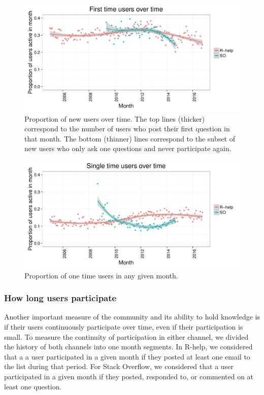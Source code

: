 \documentclass[smallextended]{svjour3}       %
\newcommand{\SO}{Stack Overflow\xspace}
\newcommand{\RH}{R-help\xspace}
\begin{document}
\begin{figure}[htbp]
  \centering
  \includegraphics[width=\textwidth]{figs/actByMonthUsers.pdf}
  \caption{Proportion of new users over time. The top lines (thicker) correspond to
    the number of users who post their first question in that month.
The bottom (thinner) lines  correspond to the subset of new users who only ask one
    questions and never participate again. }
  \label{fig:newusers}
\end{figure}

\begin{figure}[htbp]
  \centering
  \includegraphics[width=\textwidth]{figs/actByMonthUsersOnce.pdf}
  \caption{Proportion of one time users in any given month. }
  \label{fig:newusersOnce}
\end{figure}



\subsubsection{How long users participate}

Another important measure of the community and its ability to hold knowledge is if their users continuously participate
over time, even if their participation is small. To measure the continuity of participation in either
channel, we divided the history of both channels into one month segments. In \RH, we considered that a a user participated in a given month if they
posted at least one email to the list during that period. For \SO, we considered that a user participated in a given month if they
posted, responded to, or commented on at least one question.
\end{document}
